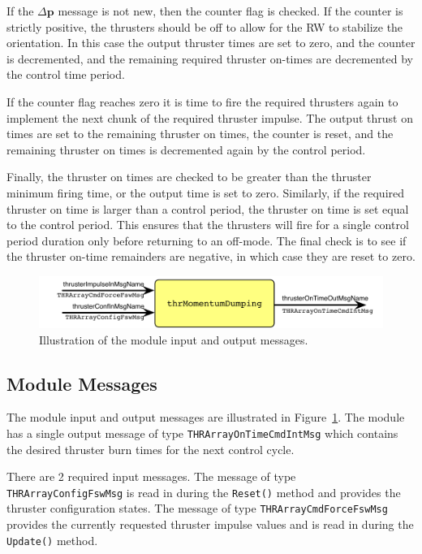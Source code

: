 \documentclass[]{BasiliskReportMemo}
\begin{document}
If the $\Delta\bm p$ message is not new, then the counter flag is checked.  If the counter is strictly positive, the thrusters should be off to allow for the RW to stabilize the orientation.  In this case the output thruster times are set to zero, and the counter is decremented, and the remaining required thruster on-times are decremented by the control time period.

If the counter flag reaches zero it is time to fire the required thrusters again to implement the next chunk of the required thruster impulse.  The output thrust on times are set to the remaining thruster on times, the counter is reset, and the remaining thruster on times is decremented again by the control period.

Finally, the thruster on times are checked to be greater than the thruster minimum firing time, or the output time is set to zero.  Similarly, if the required thruster on time is larger than a control period, the thruster on time is set equal to the control period.  This ensures that the thrusters will fire for a single control period duration only before returning to an off-mode.  The final check is to see if the thruster on-time remainders are negative, in which case they are reset to zero.



\begin{figure}[h]
	\centerline{
		\includegraphics{Figures/moduleImg}
	}
	\caption{Illustration of the module input and output messages.}
	\label{fig:moduleImg}
\end{figure}





\subsection{Module Messages}
The module input and output messages are illustrated in Figure~\ref{fig:moduleImg}.  The module has a single output message of type {\tt THRArrayOnTimeCmdIntMsg} which contains the desired thruster burn times for the next control cycle.

There are 2 required input messages.  The message of type {\tt THRArrayConfigFswMsg} is read in during the {\tt Reset()} method and provides the thruster configuration states.  The message of type {\tt THRArrayCmdForceFswMsg} provides the currently requested thruster impulse values and is read in during the {\tt Update()} method.
\end{document}
